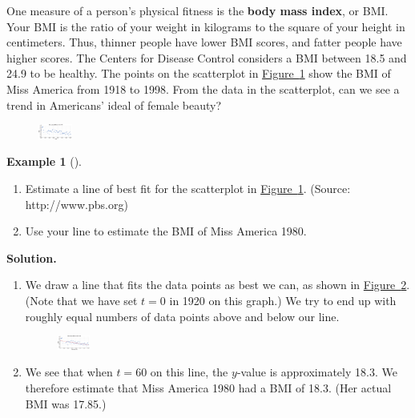 \documentclass[10pt,]{book}
\newcommand{\terminology}[1]{\textbf{#1}}
\theoremstyle{plain}
\theoremstyle{definition}
\theoremstyle{definition}
\newtheorem{example}[theorem]{Example}
\numberwithin{equation}{section}
\begin{document}
        One measure of a person's physical fitness is the \terminology{body mass index}, or BMI. Your BMI is the ratio of your weight in kilograms to the square of your height in centimeters. Thus, thinner people have lower BMI scores, and fatter people have higher scores. The Centers for Disease Control considers a BMI between 18.5 and 24.9 to be healthy. The points on the scatterplot in \hyperref[fig-BMI]{Figure~\ref{fig-BMI}} show the BMI of Miss America from 1918 to 1998. From the data in the scatterplot, can we see a trend in Americans’ ideal of female beauty?
\leavevmode%
\begin{figure}
\centering
\includegraphics[width=0.100\textwidth,]{images/fig-BMI.svg}\caption{\label{fig-BMI}}
\end{figure}
\begin{example}[]\label{example-BMI}
\leavevmode%
\begin{enumerate}[label=*\alph**]
\item\hypertarget{li-193}{}Estimate a line of best fit for the scatterplot in \hyperref[fig-BMI]{Figure~\ref{fig-BMI}}. (Source: http://www.pbs.org)\item\hypertarget{li-194}{}Use your line to estimate the BMI of Miss America 1980.\end{enumerate}
\par\medskip\noindent%
\textbf{Solution.}\quad \leavevmode%
\begin{enumerate}[label=*\alph**]
\item\hypertarget{li-195}{}We draw a line that fits the data points as best we can, as shown in \hyperref[fig-BMI2]{Figure~\ref{fig-BMI2}}. (Note that we have set \(t = 0\) in 1920 on this graph.) We try to end up with roughly equal numbers of data points above and below our line. 
        \leavevmode%
\begin{figure}
\centering
\includegraphics[width=0.100\textwidth,]{images/fig-BMI2.svg}\caption{\label{fig-BMI2}}
\end{figure}
\item\hypertarget{li-196}{}We see that when \(t = 60\) on this line, the \(y\)-value is approximately 18.3. We therefore estimate that Miss America 1980 had a BMI of 18.3. (Her actual BMI was 17.85.)\end{enumerate}
\end{example}
\end{document}
